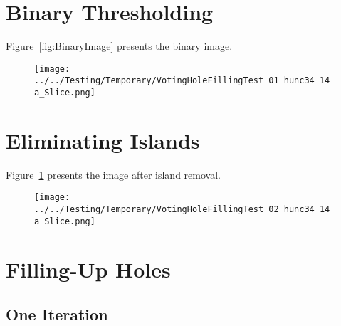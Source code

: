 \documentclass{InsightArticle}
\begin{document}
\section{Binary Thresholding}

\begin{center}

\end{center}

Figure~\ref{fig:BinaryImage} presents the binary image.



\clearpage
\begin{figure}
\center
\texttt{[image: ../../Testing/Temporary/VotingHoleFillingTest\_01\_hunc34\_14\_a\_Slice.png]}
\label{fig:IslandRemovalImage}
\end{figure}

\section{Eliminating Islands}

\begin{center}

\end{center}

Figure~\ref{fig:IslandRemovalImage} presents the image after island removal.


\clearpage
\begin{figure}
\center
\texttt{[image: ../../Testing/Temporary/VotingHoleFillingTest\_02\_hunc34\_14\_a\_Slice.png]}
\label{fig:HoleFillingIteration01Image}
\end{figure}


\section{Filling-Up Holes}

\begin{center}

\end{center}


\subsection{One Iteration}
\end{document}
